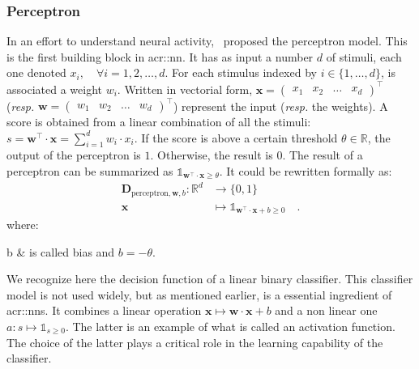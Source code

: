         \subsubsection{Perceptron}
            In an effort to understand neural activity,~\textcite{rosenblatt1958perceptron} proposed the perceptron model.
            This is the first building block in \gls{acr::nn}.
            It has as input a number $d$ of stimuli, each one denoted $x_i,\quad \forall i = 1,2,\dots,d$.
            For each stimulus indexed by $i\in \{1,\dots,d\}$, is associated a weight $w_i$.
            Written in vectorial form, $\bm{x} = \begin{pmatrix}x_1 & x_2 & \hdots  & x_d \end{pmatrix}^\intercal$ (\textit{resp.} $\bm{w} = \begin{pmatrix}w_1 & w_2 & \hdots & w_d \end{pmatrix}^\intercal$) represent the input (\textit{resp.} the weights).
            A score is obtained from a linear combination of all the stimuli: $s = \bm{w}^\intercal \cdot \bm{x} = \sum_{i=1}^{d} w_i \cdot x_i$.
            If the score is above a certain threshold $\theta \in \mathbb{R}$, the output of the perceptron is $1$.
            Otherwise, the result is $0$.
            The result of a perceptron can be summarized as $\mathbb{1}_{\bm{w}^\intercal \cdot \bm{x} \geq \theta}$.
            It could be rewritten formally as:
            \begin{equation}
                \label{eq::perceptron}
                \begin{aligned}
                    \mathbf{D}_{\text{perceptron}, \bm{w}, b}: \mathbb{R}^d &\rightarrow \{0, 1\}\\
                    \bm{x} &\mapsto \mathbb{1}_{\bm{w}^\intercal \cdot \bm{x} + b\geq 0} \quad.
                \end{aligned}
            \end{equation}
            where:
            \begin{conditions}
                b & is called bias and $b = - \theta $.
            \end{conditions}
            We recognize here the decision function of a linear binary classifier.
            This classifier model is not used widely, but as mentioned earlier, is a essential ingredient of \glspl{acr::nn}.
            It combines a linear operation $\bm{x} \mapsto \bm{w} \cdot \bm{x} + b$ and a non linear one $a: s \mapsto \mathbb{1}_{s \geq 0}$.
            The latter is an example of what is called an activation function.
            The choice of the latter plays a critical role in the learning capability of the classifier.
